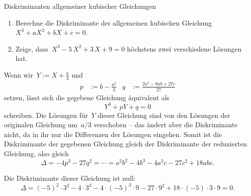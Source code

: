 \documentclass{algblatt}
\begin{document}
\begin{aufgabe}{Diskriminanten allgemeiner kubischer Gleichungen}
\begin{enumerate}
\item Berechne die Diskriminante der allgemeinen kubischen Gleichung
$X^3 + a X^2 + b X + c = 0$.
\item Zeige, dass~$X^3 - 5\,X^2 + 3\,X + 9 = 0$ höchstens zwei verschiedene
Lösungen hat.
\end{enumerate}

\begin{loesungE}
\item Wenn wir~$Y := X + \frac{a}{3}$ und
\begin{align*}
  p &:= b - \frac{a^2}{3} &
  q &:= \frac{2a^3 - 9ab + 27c}{27}
\end{align*}
setzen, lässt sich die gegebene Gleichung äquivalent als
\[ Y^3 + pY + q = 0 \]
schreiben. Die Lösungen für~$Y$ dieser Gleichung sind von den Lösungen der
originalen Gleichung um~$a/3$ verschoben -- das ändert aber die Diskriminante
nicht, da in ihr nur die Differenzen der Lösungen eingehen. Somit ist die
Diskriminante der gegebenen Gleichung gleich der Diskriminante der reduzierten
Gleichung, also gleich
\[ \Delta = -4p^3 - 27q^2 = \cdots = a^2b^2 - 4b^3 - 4a^3c - 27c^2 + 18abc. \]

\item Die Diskriminante dieser Gleichung ist null:
\[ \Delta = (-5)^2 \cdot 3^2 - 4 \cdot 3^3 - 4 \cdot (-5)^3 \cdot 9 - 27 \cdot
9^2 + 18\cdot(-5)\cdot3\cdot9 = 0. \]
\end{loesungE}
\end{aufgabe}
\end{document}
